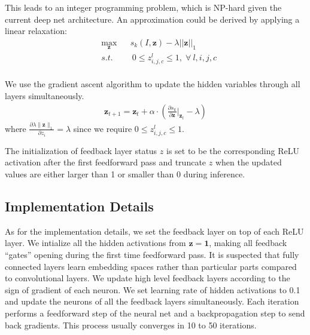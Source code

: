 This leads to an integer programming problem, which is NP-hard given the current deep net architecture. An approximation could be derived by applying a linear relaxation:
\begin{equation}
\begin{aligned}
& \max_\mathbf{z} & & s_k(I, \mathbf{z}) - \lambda ||\mathbf{z}||_1 \\
& s.t. & & \ 0 \leq z^l_{i,j,c} \leq 1, \; \forall\ l, i, j, c\\
\end{aligned}
\end{equation}

We use the gradient ascent algorithm to update the hidden variables through all layers simultaneously.
\begin{equation}
\begin{aligned}
\mathbf{z}_{t+1} = \mathbf{z}_t + \alpha \cdot (\frac{\partial s_k}{\partial \mathbf{z}} |_{\mathbf{z}_t} - \lambda)
\end{aligned}
\end{equation}
where $\frac{\partial \lambda \|\mathbf{z}\|_1}{\partial z_i} = \lambda$ since we require $0 \leq z^l_{i,j,c} \leq 1$.

The initialization of feedback layer status $z$ is set to be the corresponding ReLU activation after the first feedforward pass and truncate $z$ when the updated values are either larger than 1 or smaller than 0 during inference.

\subsection{Implementation Details}
As for the implementation details, we set the feedback layer on top of each ReLU layer. We intialize all the hidden activations from $\mathbf{z}=\mathbf{1}$, making all feedback ``gates'' opening during the first time feedforward pass. It is suspected that fully connected layers learn embedding spaces rather than particular parts compared to convolutional layers. We update high level feedback layers according to the sign of gradient of each neuron. We set learning rate of hidden activations to 0.1 and update the neurons of all the feedback layers simultaneously. Each iteration performs a feedforward step of the neural net and a backpropagation step to send back gradients. This process usually converges in 10 to 50 iterations.
